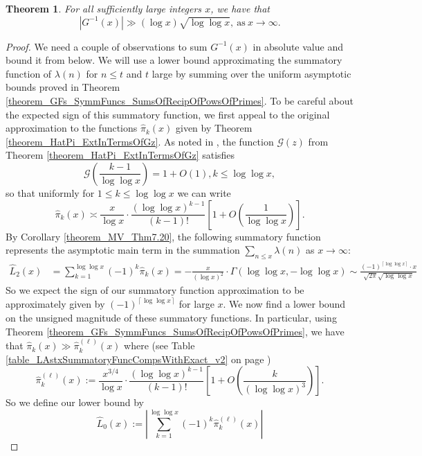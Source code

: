 \documentclass[11pt,reqno,a4letter]{article}
\numberwithin{figure}{section}
\numberwithin{table}{section}
\newcommand{\ceiling}[1]{\left\lceil #1 \right\rceil}
\theoremstyle{plain}
\newtheorem{theorem}{Theorem}
\numberwithin{theorem}{section}
\theoremstyle{definition}
\begin{document}
\begin{theorem} 
\label{theorem_GInvxLowerBoundByGEInvx_v1} 
For all sufficiently large integers $x$, we have that 
\[
|G^{-1}(x)| \gg (\log x) \sqrt{\log\log x}, \mathrm{\ as\ } x \rightarrow \infty. 
\]
\end{theorem} 
\begin{proof} 
We need a couple of observations to sum $G^{-1}(x)$ in absolute value and bound it from below. 
We will use a lower bound approximating the summatory function of $\lambda(n)$ for $n \leq t$ and 
$t$ large by summing over the uniform asymptotic bounds proved in 
Theorem \ref{theorem_GFs_SymmFuncs_SumsOfRecipOfPowsOfPrimes}. 
To be careful about the expected sign of this summatory function, 
we first appeal to the original approximation to the functions $\widehat{\pi}_k(x)$ 
given by Theorem \ref{theorem_HatPi_ExtInTermsOfGz}. 
As noted in \cite[\S 7.4]{MV}, the function $\mathcal{G}(z)$ from 
Theorem \ref{theorem_HatPi_ExtInTermsOfGz} satisfies 
\[
\mathcal{G}\left(\frac{k-1}{\log\log x}\right) = 1 + O(1), k \leq \log\log x, 
\]
so that uniformly for $1 \leq k \leq \log\log x$ we can write 
\[
\widehat{\pi}_k(x) \asymp \frac{x}{\log x} \cdot \frac{(\log\log x)^{k-1}}{(k-1)!} \left[ 
     1 + O\left(\frac{1}{\log\log x}\right)\right]. 
\]
By Corollary \ref{theorem_MV_Thm7.20}, the 
following summatory function represents the asymptotic main term 
in the summation $\sum_{n \leq x} \lambda(n)$ as $x \rightarrow \infty$: 
\begin{align*} 
\widehat{L}_2(x) & = \sum_{k=1}^{\log\log x} (-1)^{k} \widehat{\pi}_k(x) 
     = - \frac{x}{(\log x)^2} \cdot \Gamma(\log\log x, -\log\log x) 
     \sim \frac{(-1)^{\ceiling{\log\log x}} \cdot x}{\sqrt{2\pi} \sqrt{\log\log x}}
\end{align*} 
So we expect the sign of our summatory function approximation to be approximately 
given by $(-1)^{\ceiling{\log\log x}}$ for large $x$. 
We now find a lower bound on the unsigned magnitude of these summatory functions. 
In particular, using Theorem \ref{theorem_GFs_SymmFuncs_SumsOfRecipOfPowsOfPrimes}, 
we have that $\widehat{\pi}_k(x) \gg \widehat{\pi}_k^{(\ell)}(x)$ where 
(see Table \ref{table_LAstxSummatoryFuncCompsWithExact_v2} on page 
\pageref{table_LAstxSummatoryFuncCompsWithExact_v2}) 
\[
\widehat{\pi}_k^{(\ell)}(x) := \frac{x^{3/4}}{\log x} \cdot 
     \frac{(\log\log x)^{k-1}}{(k-1)!} \left[1 + 
     O\left(\frac{k}{(\log\log x)^3}\right)\right].
\]
So we define our lower bound by 
\[
\widehat{L}_0(x) := \left\lvert \sum_{k=1}^{\log\log x} (-1)^{k} \widehat{\pi}_k^{(\ell)}(x) \right\rvert 
\]
\end{proof}
\end{document}
